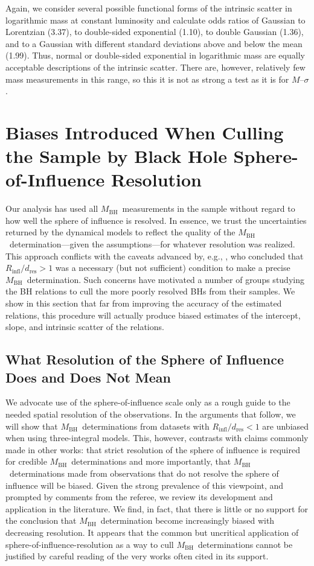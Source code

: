 \documentclass[twosided,letterpaper,numberedappendix]{emulateapj}
\newcommand{\msigma}   {\ensuremath{M}{--}\ensuremath{\sigma}}
\newcommand{\mbh}      {\ensuremath{M_{\mathrm{BH}}}}
\newcommand{\rinfres} {\ensuremath{R_{\mathrm{infl}} / d_{\mathrm{res}}}}
\begin{document}
Again, we consider several possible functional forms of the intrinsic
scatter in logarithmic mass at constant luminosity and calculate odds
ratios of Gaussian to Lorentzian (3.37), to double-sided exponential
(1.10), to double Gaussian (1.36), and to a Gaussian with different
standard deviations above and below the mean (1.99).  Thus, normal or
double-sided exponential in logarithmic mass are equally acceptable
descriptions of the intrinsic scatter.  There are, however, relatively
few mass measurements in this range, so this it is not as strong a
test as it is for \msigma.


\section{Biases Introduced When Culling the Sample by Black Hole 
Sphere-of-Influence Resolution}
\label{influence}

Our analysis has used all \mbh\ measurements in the sample without
regard to how well the sphere of influence is resolved.  In essence,
we trust the uncertainties returned by the dynamical models to reflect
the quality of the \mbh\ determination---given the assumptions---for
whatever resolution was realized.  This approach conflicts with the
caveats advanced by, e.g., \citet{ferrarese02}, who concluded that
$\rinfres > 1$ was a necessary (but not sufficient) condition to make
a precise \mbh\ determination.  Such concerns have motivated a number
of groups studying the BH relations \citep[e.g.,][]{mf01a,ff05} to
cull the more poorly resolved BHs from their samples.  We show in this
section that far from improving the accuracy of the estimated
relations, this procedure will actually produce biased estimates of
the intercept, slope, and intrinsic scatter of the relations.  

\subsection{What Resolution of the Sphere of Influence Does and Does Not Mean}
\label{nomoresoi}
We advocate use of the sphere-of-influence scale only as a rough guide
to the needed spatial resolution of the observations.  In the
arguments that follow, we will show that \mbh\ determinations from
datasets with $\rinfres < 1$ are unbiased when using three-integral
models.  This, however, contrasts with claims commonly made in other
works: that strict resolution of the sphere of influence is required
for credible \mbh\ determinations and more importantly, that \mbh\
determinations made from observations that do not resolve the sphere
of influence will be biased.  Given the strong prevalence of this
viewpoint, and prompted by comments from the referee, we review its
development and application in the literature.  We find, in fact, that
there is little or no support for the conclusion that \mbh\
determination become increasingly biased with decreasing resolution.
It appears that the common but uncritical application of
sphere-of-influence-resolution as a way to cull \mbh\ determinations
cannot be justified by careful reading of the very works often cited
in its support.
\end{document}
